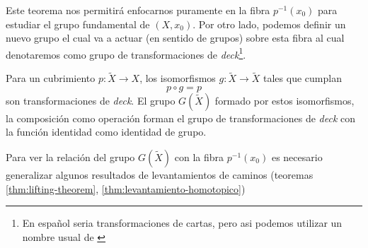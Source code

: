 Este teorema nos permitirá enfocarnos puramente en la fibra \(p ^{-1}
(x_0)\) para estudiar el grupo fundamental de \((X, x_0)\). Por otro
lado, podemos definir un nuevo grupo el cual va a actuar (en sentido de
grupos) sobre esta fibra al cual denotaremos como grupo de
transformaciones de \emph{deck}\footnote{En español seria transformaciones de
  cartas, pero asi podemos utilizar un nombre usual de \cite{Hatcher}}.
\begin{definicion}\label{def:deck}
  Para un cubrimiento \(p : \tilde X \to X\), los isomorfismos \(g : \tilde
  X \to \tilde X\) tales que cumplan
  \[ p \circ g = p \]
  son transformaciones de \emph{deck}. El grupo \(G (\tilde X)\) formado
  por estos isomorfismos, la composición como operación forman el grupo
  de transformaciones de \emph{deck} con la función identidad como
  identidad de grupo.
\end{definicion}
Para ver la relación del grupo \(G(\tilde X)\) con la fibra \(p^{-1}
(x_0)\) es necesario generalizar algunos resultados de levantamientos de
caminos (teoremas \ref{thm:lifting-theorem},
\ref{thm:levantamiento-homotopico})

